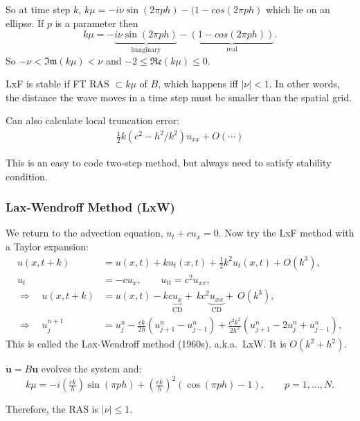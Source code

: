 \documentclass[12pt, a4paper]{article}
\theoremstyle{definition}
\theoremstyle{remark}
\numberwithin{equation}{section}
\begin{document}
So at time step $k$, $k\mu = -i\nu\sin(2\pi ph) - (1 - cos(2\pi ph)$ which lie on
an ellipse. If $p$ is a parameter then
$$ k\mu = -\underbrace{i \nu \sin(2\pi p h)}_\text{imaginary} - \underbrace{(1 - cos(2\pi p h))}_\text{real}. $$
So $-\nu < \mathfrak{Im}(k\mu) < \nu$ and $-2 \le \mathfrak{Re}(k\mu) \le 0$.

LxF is stable if FT RAS $\subset k\mu$ of $B$, which happens iff $|\nu| < 1$.
In other words, the distance the wave moves in a time step must be smaller than the
spatial grid.

Can also calculate local truncation error:
 \begin{align*}
 \frac{1}{2}k(c^2 - h^2/k^2)u_{xx} + O(\cdots)
 \end{align*}
 
This is an easy to code two-step method, but always need to satisfy stability condition.

\newpage
\subsubsection{Lax-Wendroff Method (LxW)}

We return to the advection equation, $u_t + c u_x = 0$. 
Now try the LxF method with a Taylor expansion:
\begin{align*}
u(x,t+k) &= u(x,t) + k u_t(x,t) + \tfrac{1}{2} k^2 u_t(x, t) + O(k^3), \\
u_t &= -c u_x, \qquad u_{tt} = c^2 u_{xx}, \\
\Longrightarrow \quad u(x,t+k) &= u(x,t) - k c \underbrace{u_x}_\text{CD} +\ k c^2 \underbrace{u_{xx}}_{\text{CD}} +\ O(k^3), \\
\Longrightarrow \quad u_j^{n+1} &= u_j^n - \tfrac{ck}{2h}(u_{j+1}^n - u_{j-1}^n) 
        + \tfrac{c^2 k^2}{2h^2}(u_{j+1}^n - 2u_j^n + u_{j-1}^n),
\end{align*}
This is called the Lax-Wendroff method (1960s), a.k.a.~LxW. It is $O(k^2+h^2)$.

$\mathbf{\dot u} = B\mathbf{u}$ evolves the system and:
$$k\mu = -i\left(\tfrac{ck}{h}\right)\sin(\pi p h) + \left(\tfrac{ck}{h}\right)^2(\cos(\pi p h) - 1),
\qquad p=1,\ldots,N. $$

Therefore, the RAS is $|\nu| \le 1$.
\end{document}

